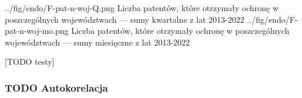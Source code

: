   \figsides
{../fig/endo/F-pat-n-woj-Q.png}
{ Liczba patentów, które otrzymały ochronę w poszczególnych województwach 
  --- sumy kwartalne z lat 2013-2022 }
{../fig/endo/F-pat-n-woj-mo.png}
{ Liczba patentów, które otrzymały ochronę w poszczególnych województwach 
  --- sumy miesięczne z lat 2013-2022 }

[TODO testy]

  \subsubsection
{TODO Autokorelacja}